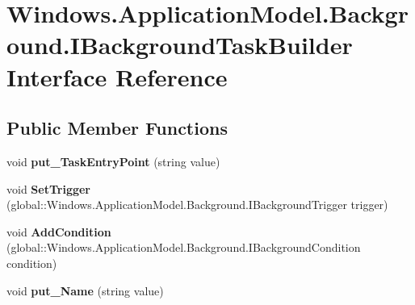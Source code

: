 \hypertarget{interface_windows_1_1_application_model_1_1_background_1_1_i_background_task_builder}{}\section{Windows.\+Application\+Model.\+Background.\+I\+Background\+Task\+Builder Interface Reference}
\label{interface_windows_1_1_application_model_1_1_background_1_1_i_background_task_builder}
\subsection*{Public Member Functions}
\begin{DoxyCompactItemize}
\item 
\mbox{\label{interface_windows_1_1_application_model_1_1_background_1_1_i_background_task_builder_a1d8e55116fd36c44eafe3e116a59e6d5}} 
void {\bfseries put\+\_\+\+Task\+Entry\+Point} (string value)
\item 
\mbox{\label{interface_windows_1_1_application_model_1_1_background_1_1_i_background_task_builder_a6389795cf781758bafc44a855ab10489}} 
void {\bfseries Set\+Trigger} (global\+::\+Windows.\+Application\+Model.\+Background.\+I\+Background\+Trigger trigger)
\item 
\mbox{\label{interface_windows_1_1_application_model_1_1_background_1_1_i_background_task_builder_aec7ccba5da7c8fc1b163a9871f3aba7c}} 
void {\bfseries Add\+Condition} (global\+::\+Windows.\+Application\+Model.\+Background.\+I\+Background\+Condition condition)
\item 
\mbox{\label{interface_windows_1_1_application_model_1_1_background_1_1_i_background_task_builder_a6afa1eee875932d0aededbdee329d0c9}} 
void {\bfseries put\+\_\+\+Name} (string value)
\item 
\mbox{\label{interface_windows_1_1_application_model_1_1_background_1_1_i_background_task_builder_a3ba4e67514edc80bd1d8315fdbef330f}} 

\end{DoxyCompactItemize}

